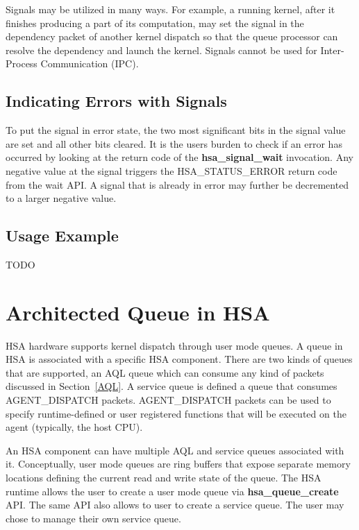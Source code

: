 \documentclass{book}
\newcommand{\reffun}[1]{\textbf{#1}}
\newcommand{\reftyp}[1]{#1}
\newcommand{\refenu}[1]{\reftyp{#1}}
\begin{document}
Signals may be utilized in many ways. For example, a running kernel,
after it finishes producing a part of its computation, may set the
signal in the dependency packet of another kernel dispatch so that the
queue processor can resolve the dependency and launch the
kernel. Signals cannot be used for Inter-Process Communication (IPC).

\hypertarget{signal_error}{} \subsection{ Indicating Errors with
  Signals} \label{signal_error} To put the signal in error state, the
two most significant bits in the signal value are set and all other
bits cleared. It is the users burden to check if an error has occurred
by looking at the return code of the \reffun{hsa\_signal\_wait}
invocation. Any negative value at the signal triggers the
\refenu{HSA\_STATUS\_ERROR} return code from the wait API. A signal
that is already in error may further be decremented to a larger
negative value.

\hypertarget{signal_example}{} \subsection{Usage Example}
TODO

\hypertarget{architected\_queue}{} \section{Architected Queue in
HSA} \label{architected_queue}

HSA hardware supports kernel dispatch through user mode queues.  A
queue in HSA is associated with a specific HSA component. There are
two kinds of queues that are supported, an AQL queue which can consume
any kind of packets discussed in Section~\ref{AQL}. A service queue is
defined a queue that consumes \refenu{AGENT\_DISPATCH}
packets. \refenu{AGENT\_DISPATCH} packets can be used to specify
runtime-defined or user registered functions that will be executed on
the agent (typically, the host CPU).

An HSA component can have multiple AQL and service queues associated
with it.  Conceptually, user mode queues are ring buffers that
expose separate memory locations defining the current read and write
state of the queue. The HSA runtime allows the user to create a user
mode queue via \reffun{hsa\_queue\_create} API. The same API also
allows to user to create a service queue. The user may chose to
manage their own service queue.
\end{document}
